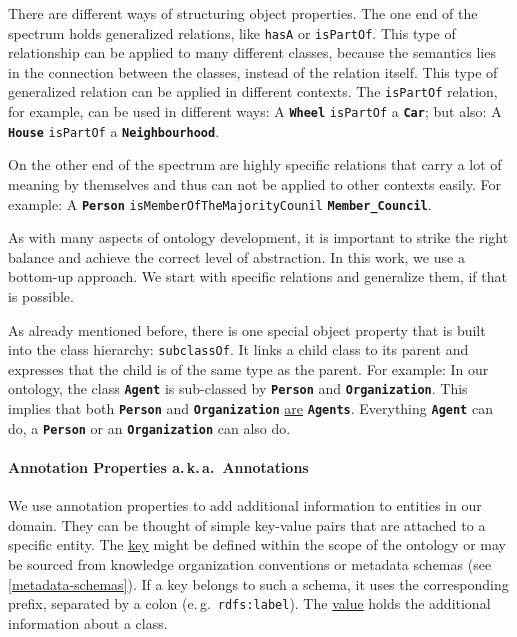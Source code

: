 \documentclass[a4paper, DIV=13, BCOR=0cm]{scrbook}
\newcommand{\eg}{e.\,g.\ }
\newcommand{\aka}{a.\,k.\,a.\ }
\newcommand{\class}[1]{\texttt{\textbf{#1}}}
\newcommand{\relation}[1]{\texttt{#1}}
\newcommand{\prop}[1]{\texttt{#1}}
\begin{document}
There are different ways of structuring object properties. The one end of the spectrum holds generalized relations, like \relation{hasA} or \relation{isPartOf}. This type of relationship can be applied to many different classes, because the semantics lies in the connection between the classes, instead of the relation itself. This type of generalized relation can be applied in different contexts. The \relation{isPartOf} relation, for example, can be used in different ways: A \class{Wheel} \relation{isPartOf} a \class{Car}; but also: A \class{House} \relation{isPartOf} a \class{Neighbourhood}.

On the other end of the spectrum are highly specific relations that carry a lot of meaning by themselves and thus can not be applied to other contexts easily. For example: A \class{Person} \relation{isMemberOfTheMajorityCounil} \class{Member\_Council}.

As with many aspects of ontology development, it is important to strike the right balance and achieve the correct level of abstraction. In this work, we use a bottom-up approach. We start with specific relations and generalize them, if that is possible.

As already mentioned before, there is one special object property that is built into the class hierarchy: \relation{subclassOf}. It links a child class to its parent and expresses that the child is of the same type as the parent. For example: In our ontology, the class \class{Agent} is sub-classed by \class{Person} and \class{Organization}. This implies that both \class{Person} and \class{Organization} \underline{are} \class{Agents}. Everything \class{Agent} can do, a \class{Person} or an \class{Organization} can also do.

\paragraph{Annotation Properties \aka Annotations}
\label{annotation-properties}
We use annotation properties to add additional information to entities in our domain. They can be thought of simple key-value pairs that are attached to a specific entity. The \underline{key} might be defined within the scope of the ontology or may be sourced from knowledge organization conventions or metadata schemas (see \autoref{metadata-schemas}). If a key belongs to such a schema, it uses the corresponding prefix, separated by a colon (\eg \prop{rdfs:label}). The \underline{value} holds the additional information about a class.
\end{document}
